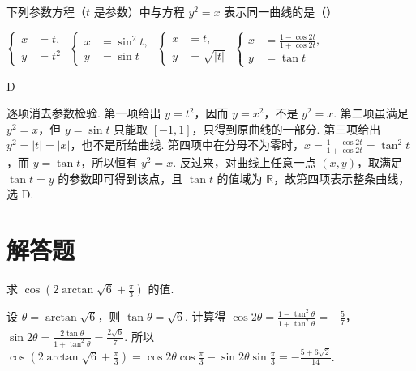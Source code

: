 \documentclass[UTF8,a4paper,oneside,11pt]{ctexbook}
\begin{document}
\begin{problem}
下列参数方程（\(t\) 是参数）中与方程 \(y^2=x\) 表示同一曲线的是（\quad）

\choices
    {\(\left\{\begin{aligned}x&=t,\\ y&=t^2\end{aligned}\right.\)}
    {\(\left\{\begin{aligned}x&=\sin^2 t,\\ y&=\sin t\end{aligned}\right.\)}
    {\(\left\{\begin{aligned}x&=t,\\ y&=\sqrt{|t|}\end{aligned}\right.\)}
    {\(\left\{\begin{aligned}x&=\frac{1-\cos 2t}{1+\cos 2t},\\ y&=\tan t\end{aligned}\right.\)}
\end{problem}

\begin{answer}
D
\end{answer}

\begin{solution}
逐项消去参数检验. 第一项给出 \(y=t^2\)，因而 \(y=x^2\)，不是 \(y^2=x\). 第二项虽满足 \(y^2=x\)，但 \(y=\sin t\) 只能取 \([-1,1]\)，只得到原曲线的一部分. 第三项给出 \(y^2=|t|=|x|\)，也不是所给曲线. 第四项中在分母不为零时，\(x=\frac{1-\cos2t}{1+\cos2t}=\tan^2t\)，而 \(y=\tan t\)，所以恒有 \(y^2=x\). 反过来，对曲线上任意一点 \((x,y)\)，取满足 \(\tan t=y\) 的参数即可得到该点，且 \(\tan t\) 的值域为 \(\mathbb R\)，故第四项表示整条曲线，选 D.
\end{solution}

\section{解答题}

\begin{problem}
求 \(\cos\left( 2\arctan\sqrt{6}+\frac{\pi}{3} \right)\) 的值.
\end{problem}

\begin{solution}
设 \(\theta=\arctan\sqrt{6}\)，则 \(\tan\theta=\sqrt{6}\). 计算得 \(\cos 2\theta=\frac{1-\tan^2\theta}{1+\tan^2\theta}=-\frac{5}{7}\)，\(\sin 2\theta=\frac{2\tan\theta}{1+\tan^2\theta}=\frac{2\sqrt{6}}{7}\). 所以 \(\cos\left( 2\arctan\sqrt{6}+\frac{\pi}{3} \right)=\cos 2\theta \cos \frac{\pi}{3}-\sin 2\theta \sin \frac{\pi}{3}=-\frac{5+6\sqrt{2}}{14}\).
\end{solution}
\end{document}
